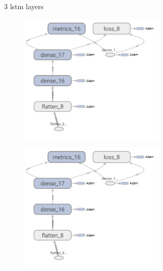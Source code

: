 \begin{figure}
\begin{subfigure}[b]{0.3\linewidth}
\begin{subfigure}[b]{\linewidth}
		\end{subfigure}
		\caption{3 lstm layers}
	\end{subfigure}
	\begin{subfigure}[b]{0.3\linewidth}
		\begin{subfigure}[b]{\linewidth}
			\includegraphics[width=\linewidth]{plots/rnn-candidates-placeholder.png}
		\end{subfigure}
		\begin{subfigure}[b]{\linewidth}
			\includegraphics[width=\linewidth]{plots/rnn-candidates-placeholder.png}

\end{subfigure}
\end{subfigure}
\end{figure}
